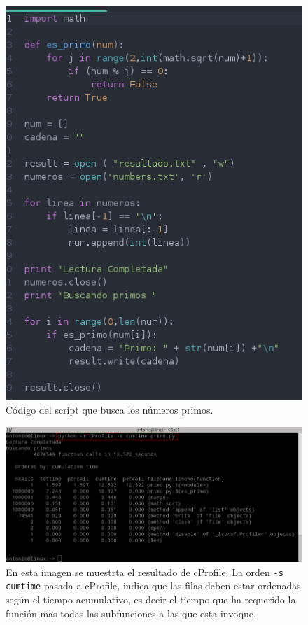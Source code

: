\begin{figure}[H]
  \begin{center}
    \includegraphics[width=1\textwidth]{imagenes/primo}
    \caption{Código del script que busca los números primos.}
    \label{fig20}
  \end{center}
\end{figure}

\begin{figure}[H]
  \begin{center}
    \includegraphics[width=1\textwidth]{imagenes/cprof}
    \caption{En esta imagen se muestrta el resultado de cProfile. La orden \texttt{-s cumtime} pasada a cProfile, indica que las filas deben estar ordenadas según el tiempo acumulativo, es decir el tiempo que ha requerido la función mas todas las subfunciones a las que esta invoque. }
    \label{fig21}
  \end{center}
\end{figure}


